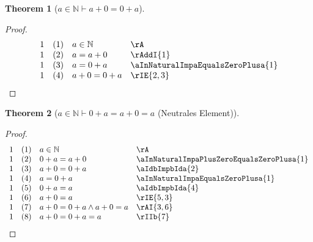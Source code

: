 \documentclass{book}
\theoremstyle{plain}
\newtheorem{theorem}{Theorem}
\theoremstyle{remark}
\theoremstyle{definition}
\begin{document}
\label{aInNaturalImpaPlusZeroEqualsZeroPlusa}
\begin{theorem}[\(a\in\mathbb{N}\vdash a+0=0+a\)]
\end{theorem}
\begin{proof}
        \[
	\begin{array}{llll}
            1   &  (1) & a\in\mathbb{N} & \rA \\
            1   &  (2) & a = a+0 & \rAddI{1} \\
            1   &  (3) & a = 0+a & \aInNaturalImpaEqualsZeroPlusa{1} \\
            1   &  (4) & a+0 = 0+a & \rIE{2,3} \\
	\end{array}
	\]
\end{proof}


\label{aInNaturalImpZeroPlusaEqualsaPlusZeroEqualsa}
\begin{theorem}[\(a\in\mathbb{N}\vdash 0+a=a+0=a\) (Neutrales Element)]
\end{theorem}
\begin{proof}
        \[
	\begin{array}{llll}
            1   &  (1) & a\in\mathbb{N} & \rA \\
            1   &  (2) & 0+a=a+0 & \aInNaturalImpaPlusZeroEqualsZeroPlusa{1} \\
            1   &  (3) & a+0=0+a & \aIdbImpbIda{2} \\
            1   &  (4) & a=0+a & \aInNaturalImpaEqualsZeroPlusa{1} \\
            1   &  (5) & 0+a=a & \aIdbImpbIda{4} \\
            1   &  (6) & a+0=a & \rIE{5,3} \\
            1   &  (7) & a+0=0+a\land a+0=a & \rAI{3,6} \\
            1   &  (8) & a+0=0+a=a & \rIIb{7} \\
	\end{array}
	\]
\end{proof}
\end{document}
